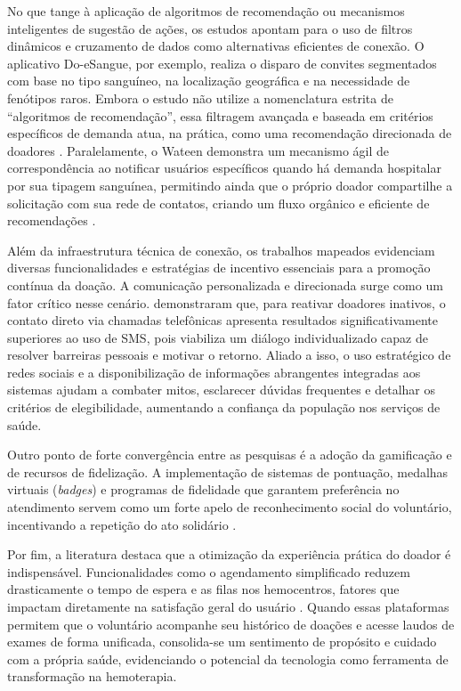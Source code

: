 No que tange à aplicação de algoritmos de recomendação ou mecanismos inteligentes de sugestão de ações, os estudos apontam para o uso de filtros dinâmicos e cruzamento de dados como alternativas eficientes de conexão. O aplicativo Do-eSangue, por exemplo, realiza o disparo de convites segmentados com base no tipo sanguíneo, na localização geográfica e na necessidade de fenótipos raros. Embora o estudo não utilize a nomenclatura estrita de ``algoritmos de recomendação'', essa filtragem avançada e baseada em critérios específicos de demanda atua, na prática, como uma recomendação direcionada de doadores \cite{dasilva2021}. Paralelamente, o Wateen demonstra um mecanismo ágil de correspondência ao notificar usuários específicos quando há demanda hospitalar por sua tipagem sanguínea, permitindo ainda que o próprio doador compartilhe a solicitação com sua rede de contatos, criando um fluxo orgânico e eficiente de recomendações \cite{alessa2022}.

Além da infraestrutura técnica de conexão, os trabalhos mapeados evidenciam diversas funcionalidades e estratégias de incentivo essenciais para a promoção contínua da doação. A comunicação personalizada e direcionada surge como um fator crítico nesse cenário.  demonstraram que, para reativar doadores inativos, o contato direto via chamadas telefônicas apresenta resultados significativamente superiores ao uso de SMS, pois viabiliza um diálogo individualizado capaz de resolver barreiras pessoais e motivar o retorno. Aliado a isso, o uso estratégico de redes sociais e a disponibilização de informações abrangentes integradas aos sistemas ajudam a combater mitos, esclarecer dúvidas frequentes e detalhar os critérios de elegibilidade, aumentando a confiança da população nos serviços de saúde.

Outro ponto de forte convergência entre as pesquisas é a adoção da gamificação e de recursos de fidelização. A implementação de sistemas de pontuação, medalhas virtuais (\textit{badges}) e programas de fidelidade que garantem preferência no atendimento servem como um forte apelo de reconhecimento social do voluntário, incentivando a repetição do ato solidário \cite{li2023}.

Por fim, a literatura destaca que a otimização da experiência prática do doador é indispensável. Funcionalidades como o agendamento simplificado reduzem drasticamente o tempo de espera e as filas nos hemocentros, fatores que impactam diretamente na satisfação geral do usuário \cite{alessa2022}. Quando essas plataformas permitem que o voluntário acompanhe seu histórico de doações e acesse laudos de exames de forma unificada, consolida-se um sentimento de propósito e cuidado com a própria saúde, evidenciando o potencial da tecnologia como ferramenta de transformação na hemoterapia.

